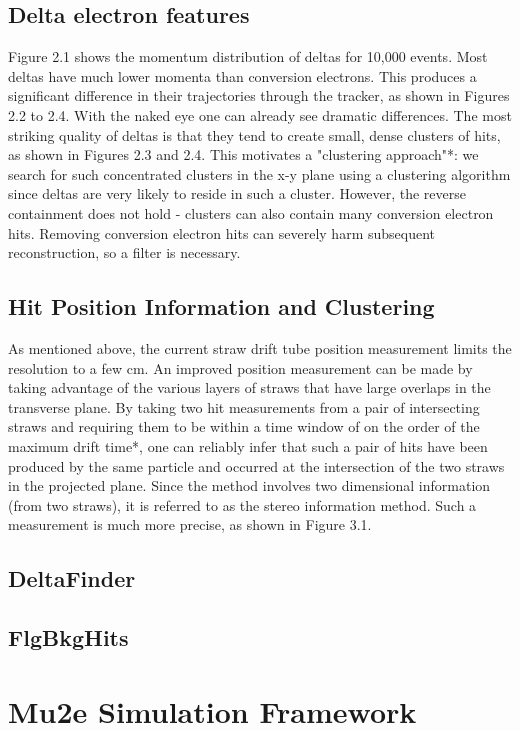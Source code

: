 \subsection{Delta electron features}
Figure 2.1 shows the momentum distribution of deltas for 10,000 events.
Most deltas have much lower momenta than conversion electrons. This produces a significant
difference in their trajectories through the tracker, as shown in Figures 2.2 to 2.4. With the naked eye
one can already see dramatic differences.
The most striking quality of deltas is that they tend to create small, dense clusters of hits, as
shown in Figures 2.3 and 2.4. This motivates a "clustering approach"*: we search for such
concentrated clusters in the x-y plane using a clustering algorithm since deltas are very likely to reside
in such a cluster. However, the reverse containment does not hold - clusters can also contain many
conversion electron hits. Removing conversion electron hits can severely harm subsequent
reconstruction, so a filter is necessary. 

\subsection{Hit Position Information and Clustering}
As mentioned above, the current straw drift tube position measurement limits the resolution to a
few cm. An improved position measurement can be made by taking advantage of the various layers of
straws that have large overlaps in the transverse plane. By taking two hit measurements from a pair of
intersecting straws and requiring them to be within a time window of on the order of the maximum
drift time*, one can reliably infer that such a pair of hits have been produced by the same particle and
occurred at the intersection of the two straws in the projected plane. Since the method involves two
dimensional information (from two straws), it is referred to as the stereo information method. Such a
measurement is much more precise, as shown in Figure 3.1.

\subsection{DeltaFinder}
\subsection{FlgBkgHits}

\section{Mu2e Simulation Framework}

